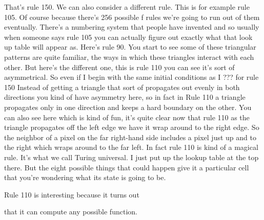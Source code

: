 \documentclass[]{article}
\begin{document}
That's rule 150.
We can also consider a different rule.
This is for example rule 105.
Of course because there's
256 possible f rules
we're going to run out of them eventually.
There's a numbering system
that people have invented
and so usually when someone says rule 105
you can actually figure out exactly
what that look up table will appear as.
Here's rule 90.
You start to see some of these triangular
patterns are quite familiar,
the ways in which these triangles
interact with each other.
But here's the different one,
this is rule 110
you can see it's sort of asymmetrical.
So even if I begin with the
same initial conditions
as I ??? for rule 150
Instead of getting a triangle that sort of
propagates out evenly in both directions
you kind of have asymmetry here,
so in fact in Rule 110
a triangle propagates
only in one direction
and keeps a hard
boundary on the other.
You can also see here which is kind of fun,
it's quite clear now that rule 110
as the triangle propagates
off the left edge
we have it wrap around
to the right edge.
So the neighbor of a pixel on the far
right-hand side
includes a pixel just up
and to the right
which wraps around
to the far left.
In fact rule 110 is kind of a magical rule.
It's what we call Turing universal.
I just put up the lookup table at the top there.
But the eight possible things that could happen
give it a particular cell that you're
wondering what its state is going to be.

Rule 110 is interesting because it turns out

that it can compute any possible function.
\end{document}
